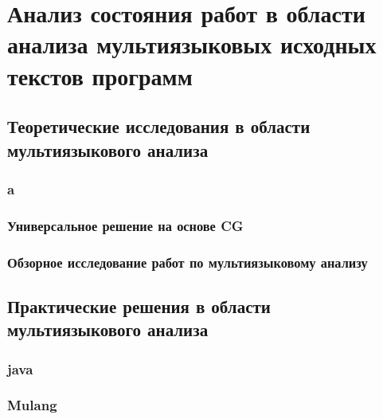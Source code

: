 \section{Анализ состояния работ в области анализа мультиязыковых исходных текстов программ}

\subsection{Теоретические исследования в области мультиязыкового анализа}

\subsubsection{a}

\subsubsection{Универсальное решение на основе CG}

\subsubsection{Обзорное исследование работ по мультиязыковому анализу}



\subsection{Практические решения в области мультиязыкового анализа}

\subsubsection{java}

\subsubsection{Mulang}

